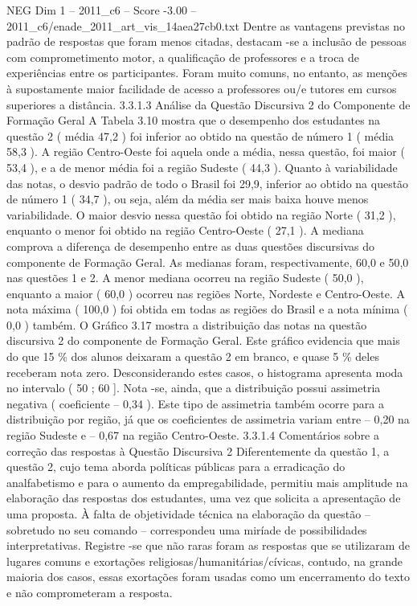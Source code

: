 \begin{textsample}{NEG Dim 1 – 2011\_c6 – Score -3.00 – 2011\_c6/enade\_2011\_art\_vis\_14aea27cb0.txt}
Dentre as vantagens previstas no padrão de respostas que foram menos citadas, destacam -se a inclusão de pessoas com comprometimento motor, a qualificação de professores e a troca de experiências entre os participantes.
Foram muito comuns, no entanto, as menções à supostamente maior facilidade de acesso a professores ou/e tutores em cursos superiores a distância. 3.3.1.3 Análise da Questão Discursiva 2 do Componente de Formação Geral A Tabela 3.10 mostra que o desempenho dos estudantes na questão 2 ( média 47,2 ) foi inferior ao obtido na questão de número 1 ( média 58,3 ).
A região Centro-Oeste foi aquela onde a média, nessa questão, foi maior ( 53,4 ), e a de menor média foi a região Sudeste ( 44,3 ).
Quanto à variabilidade das notas, o desvio padrão de todo o Brasil foi 29,9, inferior ao obtido na questão de número 1 ( 34,7 ), ou seja, além da média ser mais baixa houve menos variabilidade.
O maior desvio nessa questão foi obtido na região Norte ( 31,2 ), enquanto o menor foi obtido na região Centro-Oeste ( 27,1 ).
A mediana comprova a diferença de desempenho entre as duas questões discursivas do componente de Formação Geral.
As medianas foram, respectivamente, 60,0 e 50,0 nas questões 1 e 2.
A menor mediana ocorreu na região Sudeste ( 50,0 ), enquanto a maior ( 60,0 ) ocorreu nas regiões Norte, Nordeste e Centro-Oeste.
A nota máxima ( 100,0 ) foi obtida em todas as regiões do Brasil e a nota mínima ( 0,0 ) também.
O Gráfico 3.17 mostra a distribuição das notas na questão discursiva 2 do componente de Formação Geral.
Este gráfico evidencia que mais do que 15 \% dos alunos deixaram a questão 2 em branco, e quase 5 \% deles receberam nota zero.
Desconsiderando estes casos, o histograma apresenta moda no intervalo ( 50 ; 60 ].
Nota -se, ainda, que a distribuição possui assimetria negativa ( coeficiente – 0,34 ).
Este tipo de assimetria também ocorre para a distribuição por região, já que os coeficientes de assimetria variam entre – 0,20 na região Sudeste e – 0,67 na região Centro-Oeste. 3.3.1.4 Comentários sobre a correção das respostas à Questão Discursiva 2 Diferentemente da questão 1, a questão 2, cujo tema aborda políticas públicas para a erradicação do analfabetismo e para o aumento da empregabilidade, permitiu mais amplitude na elaboração das respostas dos estudantes, uma vez que solicita a apresentação de uma proposta.
À falta de objetividade técnica na elaboração da questão – sobretudo no seu comando – correspondeu uma miríade de possibilidades interpretativas.
Registre -se que não raras foram as respostas que se utilizaram de lugares comuns e exortações religiosas/humanitárias/cívicas, contudo, na grande maioria dos casos, essas exortações foram usadas como um encerramento do texto e não comprometeram a resposta.

\end{textsample}
